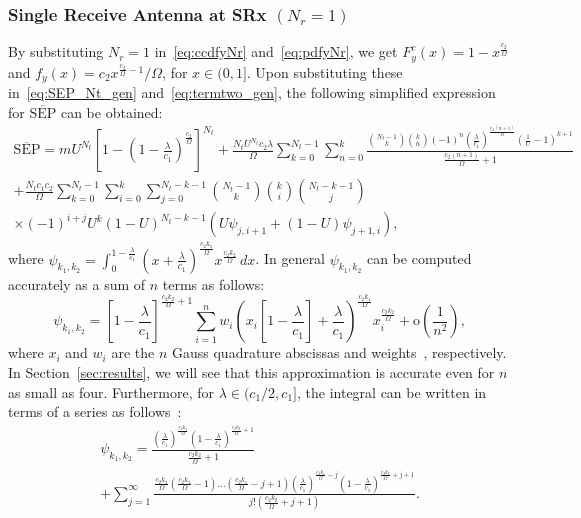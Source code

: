 \documentclass[12pt,draftcls,peerreview,onecolumn]{IEEEtran}
\newcommand{\SEP}{\text{SEP}}
\newcommand{\nck}[2]{\binom{#1}{#2}}
\newcommand{\lam}{\lambda}
\newcommand{\Nt}{{N_t}}
\newcommand{\Nr}{{N_r}}
\newcommand{\cone}{c_{1}}
\newcommand{\ctwo}{c_{2}}
\newcommand{\m}{\cone}
\newcommand{\lambym}{\frac{\lam}{\m}}
\newcommand{\al}{\ctwo}
\newcommand{\snr}{\Omega}
\newcommand{\albysnr}[1][]{\frac{\al#1}{\snr}}
\newcommand{\un}{U}
\newcommand{\psifun}[2]{\psi_{{#1},{#2}}}
\newcommand{\onemlc}{\left[1-\lambym\right]}
\newcommand{\zerosep}{m}
\newcommand{\avgSEP}{\overline{\SEP}}
\newcommand{\akone}{\albysnr[k_1]}
\newcommand{\lidx}{j}
\begin{document}
\subsubsection{Single Receive Antenna at SRx $\left(\Nr=1\right)$} 
By substituting $\Nr=1$ in~\eqref{eq:ccdfyNr} and~\eqref{eq:pdfyNr}, we get $F_{y}^{c}(x) = 1-x^{\albysnr}$ and $f_{y}(x) = \al x^{\albysnr-1}/\snr$, for $x \in (0,1]$. Upon substituting these in~\eqref{eq:SEP_Nt_gen} and~\eqref{eq:termtwo_gen}, the following simplified expression for $\avgSEP$ can be obtained:
%
\begin{multline}
\label{eq:avgSEPoneNr} 
\avgSEP =\zerosep\un^{\Nt}\left[1-\left(1-\lambym\right)^{\albysnr[]}\right]^{\Nt}
 + \!\frac{\Nt\un^{\Nt}\al\lam}{\snr}\!\! \sum_{k=0}^{\Nt-1}\!\sum_{n=0}^{k} \!\! \frac{\nck{\Nt-1}{k} \!\nck{k}{n}\!(-1)^{n}\!\!\left(\!\lambym\!\right)^{\!\!\!\!\albysnr[(n+1)]\!\!}\!\!\!\!\left(\!\frac{1}{\un}\!-\!1\!\right)^{\!k+1} \!}{\albysnr[(n+1)]+1}\\ + \frac{\Nt\m\al}{\snr} \sum_{k=0}^{\Nt-1} \sum_{i=0}^{k} \sum_{j=0}^{\Nt-k-1} \binom{\Nt-1}{k} \binom{k}{i} \binom{\Nt-k-1}{j} \\\times(-1)^{\!i+j} \un^{k} (1-\un)^{\Nt-k-1} \left( \un\psifun{j}{i+1} +  \left(1-\un\right) \psifun{j+1}{i} \right) 
,
\end{multline}
where $\psifun{k_1}{k_2} = \int_{0}^{1-\frac{\lam}{\m}} \left(x+\lambym\right)^{\albysnr[k_1]} x^{\albysnr[k_2]} \,dx$.
%
In general $\psifun{k_1}{k_2}$ can be computed accurately as a sum of $n$  terms as follows: 
\begin{equation}
\psifun{k_1}{k_2} ={\onemlc^{\albysnr[k_2]+1}} \sum_{i=1}^{n} w_{i} {\left(\!x_i\onemlc +\lambym\right)}^{\albysnr[k_1]} x_i^{\albysnr[k_2]} + \text{o}\left(\frac{1}{n^2}\!\right),
\label{eq:gauss_quad}
\end{equation}
where $x_i$ and $w_i$ are the $n$ Gauss quadrature abscissas and weights~\cite{abramowitz_stegun}, respectively. In Section~\ref{sec:results}, we will see that this approximation is accurate even for $n$ as small as four. Furthermore, for $\lam\in({\m}/{2}, \m]$, the integral can be written  in terms of a series as  follows~\cite{gradshteyn00_book}:
%
\begin{multline}
\psifun{k_1}{k_2} = \frac{\left(\lambym\right)^{\albysnr[k_1]} \left(1-\lambym\right)^{\albysnr[k_2]+1}}{\albysnr[k_2]+1} \\
+ \sum_{\lidx=1}^{\infty}\! \frac{\akone\!\!\left(\akone\!-\!1\right)\!\ldots\!\left(\akone\!-\!\lidx\!+\!1\right)\!\left(\!\lambym\!\right)^{\!\!\albysnr[k_1]  - \lidx} \!\!\left(\!1\!-\!\lambym\!\right)^{\!\!\albysnr[k_2]+\lidx+1}}{\lidx ! \left(\albysnr[k_2]+\lidx+1\right)}. 
\label{eq:inf_sum}
\end{multline}
\end{document}
